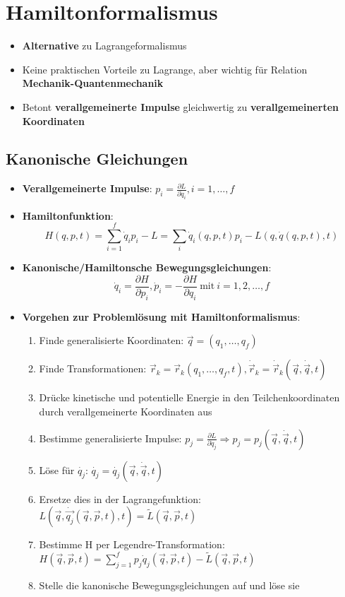 \section{Hamiltonformalismus}%
\label{hform:sec:hamiltonformalismus}

\begin{itemize}
	\item \textbf{Alternative} zu Lagrangeformalismus
	\item Keine praktischen Vorteile zu Lagrange, aber wichtig für Relation \textbf{Mechanik-Quantenmechanik}
	\item Betont \textbf{verallgemeinerte Impulse} gleichwertig zu \textbf{verallgemeinerten Koordinaten}
\end{itemize}

\subsection{Kanonische Gleichungen}
\label{hform:sub:kanonische_gleichungen}

\begin{itemize}
	\item \textbf{Verallgemeinerte Impulse}: $p_i = \frac{\partial L}{\partial \dot{q}_i}, i = 1, \dots, f$
	\item \textbf{Hamiltonfunktion}:
	$$
		H(q, p, t) = \sum^f_{i=1}\dot{q}_ip_i - L = \sum_i\dot{q}_i(q, p, t)p_i - L(q, \dot{q}(q, p, t), t)
	$$
	\item \textbf{Kanonische/Hamiltonsche Bewegungsgleichungen}:
	$$
		\dot{q}_i = \frac{\partial H}{\partial p_i}, \dot{p}_i = -\frac{\partial H}{\partial q_i}\ \text{mit}\ i = 1, 2, \dots, f
	$$
	\item \textbf{Vorgehen zur Problemlösung mit Hamiltonformalismus}:
	\begin{enumerate}
		\item Finde generalisierte Koordinaten: $\vec{q} = (q_1, \dots, q_f)$
		\item Finde Transformationen: $\vec{r}_k = \vec{r}_k(q_1, \dots, q_f, t), \dot{\vec{r}}_k = \dot{\vec{r}}_k(\vec{q}, \dot{\vec{q}}, t)$
		\item Drücke kinetische und potentielle Energie in den Teilchenkoordinaten durch verallgemeinerte Koordinaten aus
		\item Bestimme generalisierte Impulse: $p_j = \frac{\partial L}{\partial \dot{q}_j} \Rightarrow p_j = p_j(\vec{q}, \dot{\vec{q}}, t)$
		\item Löse für $\dot{q_j}$: $\dot{q_j} = \dot{q_j}(\vec{q}, \dot{\vec{q}}, t)$
		\item Ersetze dies in der Lagrangefunktion: $L(\vec{q}, \dot{\vec{q_j}}(\vec{q}, \vec{p}, t), t) = \widetilde{L}(\vec{q}, \vec{p}, t)$
		\item Bestimme H per Legendre-Transformation: $H(\vec{q}, \vec{p}, t) = \sum^f_{j=1}p_j\dot{q}_j(\vec{q}, \vec{p}, t) - \widetilde{L}(\vec{q}, \vec{p}, t)$
		\item Stelle die kanonische Bewegungsgleichungen auf und löse sie
	\end{enumerate}
\end{itemize}

